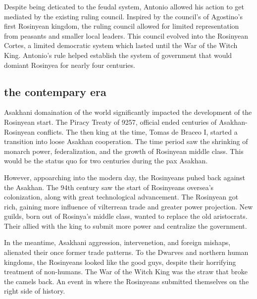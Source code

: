\documentclass[../main.tex]{subfiles}
\begin{document}
Despite being deticated to the feudal system, Antonio allowed his action to get mediated by the existing ruling 
council. Inspired by the council's of Agostino's first Rosinyean kingdom, the ruling council allowed for limited
representation from peasants and smaller local leaders. This council evolved into the Rosinyean Cortes, a 
limited democratic system which lasted until the War of the Witch King. Antonio's rule helped establish the system
of government that would domiant Rosinyea for nearly four centuries. 




\subsection{the contempary era}
Asakhani domaination of the world significantly impacted the development of the Rosinyean start. The Piracy 
Treaty of 9257, official ended centuries of Asakhan-Rosinyean conflicts. The then king at the time, 
Tomas de Braceo I, started a transition into loose Asakhan cooperation. The time period saw the shrinking of
monarch power, federalization, and the growth of Rosinyean middle class. This would be the status quo for two
centuries during the pax Asakhan.

However, appoarching into the modern day, the Rosinyeans puhed back against the Asakhan. The 94th century saw
the start of Rosinyeans oversea's colonization, along with great technological advancement. The Rosinyean got
rich, gaining more influence of vilterrean trade and greater power projection. New guilds, born out of Rosinya's 
middle class, wanted to replace the old aristocrats. Their allied with the king to submit more power and centralize
the government. 

In the meantime, Asakhani aggression, intervenetion, and foreign mishaps, alienated their once former trade
patterns. To the Dwarves and northern human kingdoms, the Rosinyeans looked like the good guys, despite their
horrifying treatment of non-humans. The War of the Witch King was the straw that broke the camels back. An
event in where the Rosinyeans submitted themselves on the right side of history.
\end{document}
